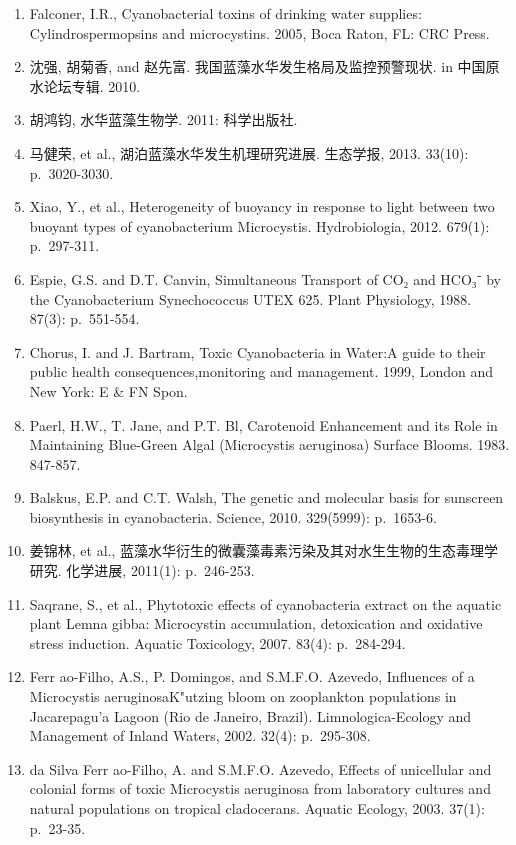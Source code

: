 \documentclass[]{book}
\begin{document}
\begin{enumerate}
\def\labelenumi{\arabic{enumi}.}
\item
  Falconer, I.R., Cyanobacterial toxins of drinking water supplies: Cylindrospermopsins and microcystins. 2005, Boca Raton, FL: CRC Press.
\item
  沈强, 胡菊香, and 赵先富. 我国蓝藻水华发生格局及监控预警现状. in 中国原水论坛专辑. 2010.
\item
  胡鸿钧, 水华蓝藻生物学. 2011: 科学出版社.
\item
  马健荣, et al., 湖泊蓝藻水华发生机理研究进展. 生态学报, 2013. 33(10): p.~3020-3030.
\item
  Xiao, Y., et al., Heterogeneity of buoyancy in response to light between two buoyant types of cyanobacterium Microcystis. Hydrobiologia, 2012. 679(1): p.~297-311.
\item
  Espie, G.S. and D.T. Canvin, Simultaneous Transport of CO₂ and HCO₃⁻ by the Cyanobacterium Synechococcus UTEX 625. Plant Physiology, 1988. 87(3): p.~551-554.
\item
  Chorus, I. and J. Bartram, Toxic Cyanobacteria in Water:A guide to their public health consequences,monitoring and management. 1999, London and New York: E \& FN Spon.
\item
  Paerl, H.W., T. Jane, and P.T. Bl, Carotenoid Enhancement and its Role in Maintaining Blue-Green Algal (Microcystis aeruginosa) Surface Blooms. 1983. 847-857.
\item
  Balskus, E.P. and C.T. Walsh, The genetic and molecular basis for sunscreen biosynthesis in cyanobacteria. Science, 2010. 329(5999): p.~1653-6.
\item
  姜锦林, et al., 蓝藻水华衍生的微囊藻毒素污染及其对水生生物的生态毒理学研究. 化学进展, 2011(1): p.~246-253.
\item
  Saqrane, S., et al., Phytotoxic effects of cyanobacteria extract on the aquatic plant Lemna gibba: Microcystin accumulation, detoxication and oxidative stress induction. Aquatic Toxicology, 2007. 83(4): p.~284-294.
\item
  Ferr ao-Filho, A.S., P. Domingos, and S.M.F.O. Azevedo, Influences of a Microcystis aeruginosaK"utzing bloom on zooplankton populations in Jacarepagu'a Lagoon (Rio de Janeiro, Brazil). Limnologica-Ecology and Management of Inland Waters, 2002. 32(4): p.~295-308.
\item
  da Silva Ferr ao-Filho, A. and S.M.F.O. Azevedo, Effects of unicellular and colonial forms of toxic Microcystis aeruginosa from laboratory cultures and natural populations on tropical cladocerans. Aquatic Ecology, 2003. 37(1): p.~23-35.

\end{enumerate}
\end{document}
